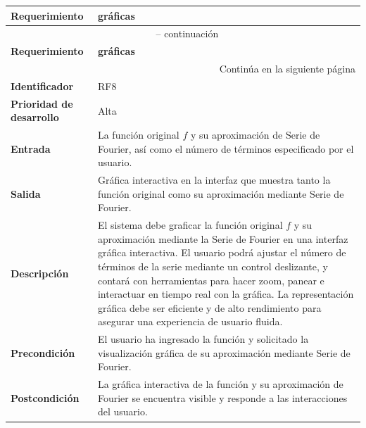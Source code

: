 \begin{longtable}{|m{3.5cm}|m{9.5cm}|}
	\hline
	\rowcolor{black!75} \color{white}\textbf{Requerimiento} & \color{white}\textbf{gráficas} \\
	\hline
	\endfirsthead
	\multicolumn{2}{c}{{\tablename\ \thetable{} -- continuación}} \\
	\hline
	\rowcolor{black!75} \color{white}\textbf{Requerimiento} & \color{white}\textbf{gráficas} \\
	\hline
	\endhead
	\hline \multicolumn{2}{r}{{Continúa en la siguiente página}} \\
	\endfoot
	\hline
	\endlastfoot
	
	\textbf{Identificador} & RF8 \\
	\hline
	\textbf{Prioridad de desarrollo} & Alta \\
	\hline
	\textbf{Entrada} & La función original \( f \) y su aproximación de Serie de Fourier, así como el número de términos especificado por el usuario. \\
	\hline
	\textbf{Salida} & Gráfica interactiva en la interfaz que muestra tanto la función original como su aproximación mediante Serie de Fourier. \\
	\hline
	\textbf{Descripción} & El sistema debe graficar la función original \( f \) y su aproximación mediante la Serie de Fourier en una interfaz gráfica interactiva. El usuario podrá ajustar el número de términos de la serie mediante un control deslizante, y contará con herramientas para hacer zoom, panear e interactuar en tiempo real con la gráfica. La representación gráfica debe ser eficiente y de alto rendimiento para asegurar una experiencia de usuario fluida. \\
	\hline
	\textbf{Precondición} & El usuario ha ingresado la función y solicitado la visualización gráfica de su aproximación mediante Serie de Fourier. \\
	\hline
	\textbf{Postcondición} & La gráfica interactiva de la función y su aproximación de Fourier se encuentra visible y responde a las interacciones del usuario. \\
	\hline
\end{longtable}
\caption{Requerimiento funcional No. 8} \label{tabla:RF8}
\vspace{0.5cm}


